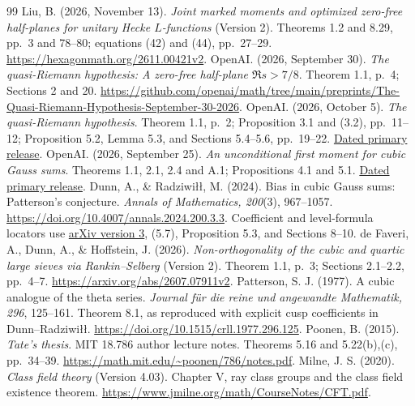 \documentclass[11pt]{article}
\begin{document}
\begin{thebibliography}{99}
 Liu, B. (2026, November 13). \emph{Joint marked moments and optimized zero-free half-planes for unitary Hecke $L$-functions} (Version 2). Theorems 1.2 and 8.29, pp.~3 and 78--80; equations (42) and (44), pp.~27--29. \url{https://hexagonmath.org/2611.00421v2}.
 OpenAI. (2026, September 30). \emph{The quasi-Riemann hypothesis: A zero-free half-plane $\Re s>7/8$}. Theorem 1.1, p.~4; Sections 2 and 20. \url{https://github.com/openai/math/tree/main/preprints/The-Quasi-Riemann-Hypothesis-September-30-2026}.
 OpenAI. (2026, October 5). \emph{The quasi-Riemann hypothesis}. Theorem 1.1, p.~2; Proposition 3.1 and (3.2), pp.~11--12; Proposition 5.2, Lemma 5.3, and Sections 5.4--5.6, pp.~19--22. \href{https://github.com/openai/math/blob/main/preprints/The-Quasi-Riemann-Hypothesis-October-5-2026/paper2.pdf}{Dated primary release}.
 OpenAI. (2026, September 25). \emph{An unconditional first moment for cubic Gauss sums}. Theorems 1.1, 2.1, 2.4 and A.1; Propositions 4.1 and 5.1. \href{https://github.com/openai/math/blob/main/preprints/An-unconditional-first-moment-for-cubic-Gauss-sums-September-25-2026/paper.pdf}{Dated primary release}.
 Dunn, A., \& Radziwi\l\l, M. (2024). Bias in cubic Gauss sums: Patterson's conjecture. \emph{Annals of Mathematics, 200}(3), 967--1057. \url{https://doi.org/10.4007/annals.2024.200.3.3}. Coefficient and level-formula locators use \href{https://arxiv.org/abs/2109.07463v3}{arXiv version 3}, (5.7), Proposition 5.3, and Sections 8--10.
 de Faveri, A., Dunn, A., \& Hoffstein, J. (2026). \emph{Non-orthogonality of the cubic and quartic large sieves via Rankin--Selberg} (Version 2). Theorem 1.1, p.~3; Sections 2.1--2.2, pp.~4--7. \url{https://arxiv.org/abs/2607.07911v2}.
 Patterson, S. J. (1977). A cubic analogue of the theta series. \emph{Journal f\"ur die reine und angewandte Mathematik, 296}, 125--161. Theorem 8.1, as reproduced with explicit cusp coefficients in Dunn--Radziwi\l\l. \url{https://doi.org/10.1515/crll.1977.296.125}.
 Poonen, B. (2015). \emph{Tate's thesis}. MIT 18.786 author lecture notes. Theorems 5.16 and 5.22(b),(c), pp.~34--39. \url{https://math.mit.edu/~poonen/786/notes.pdf}.
 Milne, J. S. (2020). \emph{Class field theory} (Version 4.03). Chapter V, ray class groups and the class field existence theorem. \url{https://www.jmilne.org/math/CourseNotes/CFT.pdf}.
\end{thebibliography}
\end{document}
